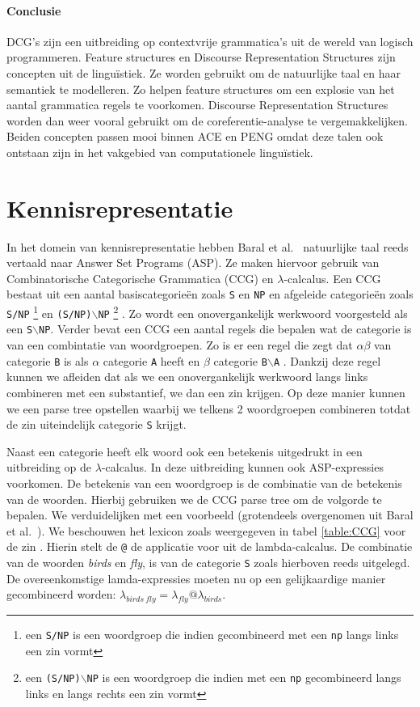 \paragraph{Conclusie} DCG's zijn een uitbreiding op contextvrije grammatica's uit de wereld van logisch programmeren. Feature structures en Discourse Representation Structures zijn concepten uit de lingu\"istiek. Ze worden gebruikt om de natuurlijke taal en haar semantiek te modelleren. Zo helpen feature structures om een explosie van het aantal grammatica regels te voorkomen. Discourse Representation Structures worden dan weer vooral gebruikt om de coreferentie-analyse te vergemakkelijken. Beiden concepten passen mooi binnen ACE en PENG omdat deze talen ook ontstaan zijn in het vakgebied van computationele lingu\"istiek.

\section{Kennisrepresentatie}
\label{sec:ASP}
In het domein van kennisrepresentatie hebben Baral et al.\ \cite{Baral2008} natuurlijke taal reeds vertaald naar Answer Set Programs (ASP). Ze maken hiervoor gebruik van Combinatorische Categorische Grammatica (CCG) en $\lambda$-calcalus. Een CCG bestaat uit een aantal basiscategorie\"en zoals \texttt{S} en \texttt{NP} en afgeleide categorie\"en zoals \texttt{S/NP} \footnote{een \texttt{S/NP} is een woordgroep die indien gecombineerd met een \texttt{np} langs links een zin vormt} en \texttt{(S/NP)$\backslash$NP} \footnote{een \texttt{(S/NP)$\backslash$NP} is een woordgroep die indien met een \texttt{np} gecombineerd langs links en langs rechts een zin vormt} \cite{Baral2008}. Zo wordt een onovergankelijk werkwoord voorgesteld als een \texttt{S$\backslash$NP}. Verder bevat een CCG een aantal regels die bepalen wat de categorie is van een combintatie van woordgroepen. Zo is er een regel die zegt dat $\alpha\beta$ van categorie \texttt{B} is als $\alpha$ categorie \texttt{A} heeft en $\beta$ categorie \texttt{B$\backslash$A} \cite{Baral2008}. Dankzij deze regel kunnen we afleiden dat als we een onovergankelijk werkwoord langs links combineren met een substantief, we dan een zin krijgen. Op deze manier kunnen we een parse tree opstellen waarbij we telkens 2 woordgroepen combineren totdat de zin uiteindelijk categorie \texttt{S} krijgt.

Naast een categorie heeft elk woord ook een betekenis uitgedrukt in een uitbreiding op de $\lambda$-calcalus. In deze uitbreiding kunnen ook ASP-expressies voorkomen. De betekenis van een woordgroep is de combinatie van de betekenis van de woorden. Hierbij gebruiken we de CCG parse tree om de volgorde te bepalen. We verduidelijken met een voorbeeld (grotendeels overgenomen uit Baral et al.\ \cite{Baral2008}). We beschouwen het lexicon zoals weergegeven in tabel \ref{table:CCG} voor de zin . Hierin stelt de \texttt{@} de applicatie voor uit de lambda-calcalus. De combinatie van de woorden \textit{birds} en \textit{fly}, is van de categorie \texttt{S} zoals hierboven reeds uitgelegd. De overeenkomstige lamda-expressies moeten nu op een gelijkaardige manier gecombineerd worden: $\lambda_{birds\ fly}=\lambda_{fly}@\lambda_{birds}$.

